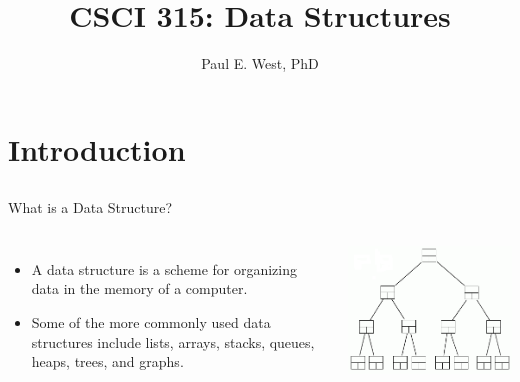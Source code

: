 \documentclass{beamer}
\title{CSCI 315: Data Structures}
\author{Paul E. West, PhD}
\institute{
  Department of Computer Science\\
  Charleston Southern University
}
\begin{document}
\begin{frame}
  \titlepage
\end{frame}

\section{Introduction}
\subsection{}

\begin{frame}{What is a Data Structure?}
\begin{columns}[c]
\begin{itemize}
\item A data structure is a scheme for organizing data in the memory of a computer. 
\item Some of the more commonly used data structures include lists, arrays, stacks, queues, heaps, trees, and graphs.
\end{itemize}
\includegraphics[width=1.0\textwidth]{../imgs/binary-tree.png}
\end{columns}
\end{frame}
\end{document}
